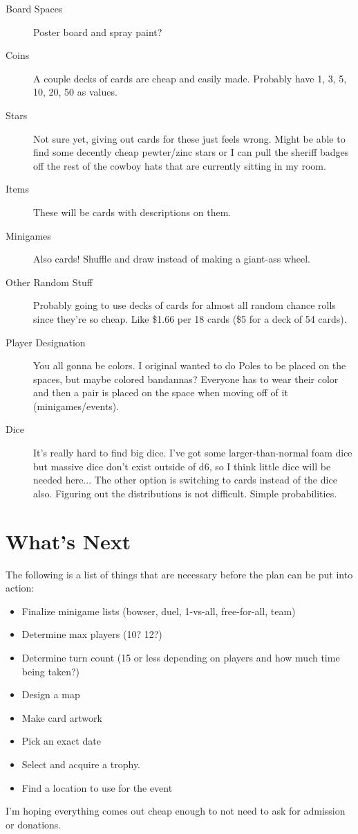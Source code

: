 \documentclass{article}
\begin{document}
\begin{description}
\item[Board Spaces] Poster board and spray paint?

\item[Coins] A couple decks of cards are cheap and easily made.
Probably have 1, 3, 5, 10, 20, 50 as values.

\item[Stars] Not sure yet, giving out cards for these just feels wrong. Might be able to find
some decently cheap pewter/zinc stars or I can pull the sheriff badges off the rest of the
cowboy hats that are currently sitting in my room.

\item[Items] These will be cards with descriptions on them.

\item[Minigames] Also cards! Shuffle and draw instead of making a giant-ass wheel.

\item[Other Random Stuff] Probably going to use decks of cards for almost all random
chance rolls since they're so cheap.  Like \$1.66 per 18 cards (\$5 for a deck of 54 cards).

\item[Player Designation] You all gonna be colors.  I original wanted to do Poles to be placed on the spaces,
but maybe colored bandannas?  Everyone has to wear their color and then a pair is placed on the space when
moving off of it (minigames/events).

\item[Dice] It's really hard to find big dice.  I've got some larger-than-normal foam dice but massive
dice don't exist outside of d6, so I think little dice will be needed here... The other option is switching
to cards instead of the dice also.  Figuring out the distributions is not difficult.  Simple probabilities.
\end{description}

\section{What's Next}

The following is a list of things that are necessary before the plan can be put into action:

\begin{itemize}
\item Finalize minigame lists (bowser, duel, 1-vs-all, free-for-all, team)
\item Determine max players (10? 12?)
\item Determine turn count (15 or less depending on players and how much time being taken?)
\item Design a map
\item Make card artwork
\item Pick an exact date
\item Select and acquire a trophy.
\item Find a location to use for the event
\end{itemize}


I'm hoping everything comes out cheap enough to not need to ask for admission or donations.
\end{document}
